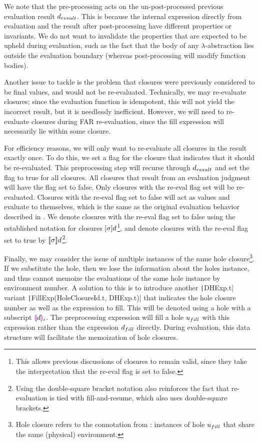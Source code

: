 We note that the pre-processing acts on the un-post-processed previous evaluation result $d_{result}$. This is because the internal expression directly from evaluation and the result after post-processing have different properties or invariants. We do not want to invalidate the properties that are expected to be upheld during evaluation, such as the fact that the body of any $\lambda$-abstraction lies outside the evaluation boundary (whereas post-processing will modify function bodies).

Another issue to tackle is the problem that closures were previously considered to be final values, and would not be re-evaluated. Technically, we may re-evaluate closures; since the evaluation function is idempotent, this will not yield the incorrect result, but it is needlessly inefficient. However, we will need to re-evaluate closures during FAR re-evaluation, since the fill expression will necessarily lie within some closure.


For efficiency reasons, we will only want to re-evaluate all closures in the result exactly once. To do this, we set a flag for the closure that indicates that it should be re-evaluated. This preprocessing step will recurse through $d_{result}$ and set the flag to true for all closures. All closures that result from an evaluation judgment will have the flag set to false. Only closures with the re-eval flag set will be re-evaluated. Closures with the re-eval flag set to false will act as values and evaluate to themselves, which is the same as the original evaluation behavior described in . We denote closures with the re-eval flag set to false using the established notation for closures $[\sigma]d$\footnote{This allows previous discussions of closures to remain valid, since they take the interpretation that the re-eval flag is set to false.}, and denote closures with the re-eval flag set to true by $\llbracket\sigma\rrbracket d$\footnote{Using the double-square bracket notation also reinforces the fact that re-evaluation is tied with fill-and-resume, which also uses double-square brackets.}.

Finally, we may consider the issue of multiple instances of the same hole closure\footnote{Hole closure refers to the connotation from : instances of hole $u_{fill}$ that share the same (physical) environment.}. If we substitute the hole, then we lose the information about the holes instance, and thus cannot memoize the evaluations of the same hole instance by environment number. A solution to this is to introduce another \texttt|DHExp.t| variant \texttt|FillExp(HoleClosureId.t, DHExp.t)| that indicates the hole closure number as well as the expression to fill. This will be denoted using a hole with a subscript $\textcolor{violet}{\llparenthesis} d\textcolor{violet}{\rrparenthesis}_i$. The preprocessing expression will fill a hole $u_{fill}$ with this expression rather than the expression $d_{fill}$ directly. During evaluation, this data structure will facilitate the memoization of hole closures.

